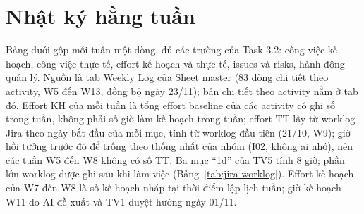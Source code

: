\chapter{Nhật ký hằng tuần}
\label{app:weekly-logs}

Bảng dưới gộp mỗi tuần một dòng, đủ các trường của Task 3.2: công việc kế hoạch, công việc thực tế, effort kế hoạch và thực tế, issues và risks, hành động quản lý. Nguồn là tab Weekly Log của Sheet master (83 dòng chi tiết theo activity, W5 đến W13, đồng bộ ngày 23/11); bản chi tiết theo activity nằm ở tab đó. Effort KH của mỗi tuần là tổng effort baseline của các activity có ghi số trong tuần, không phải số giờ làm kế hoạch trong tuần; effort TT lấy từ worklog Jira theo ngày bắt đầu của mỗi mục, tính từ worklog đầu tiên (21/10, W9); giờ hồi tưởng trước đó để trống theo thống nhất của nhóm (I02, không ai nhớ), nên các tuần W5 đến W8 không có số TT. Ba mục ``1d'' của TV5 tính 8 giờ; phần lớn worklog được ghi sau khi làm việc (Bảng~\ref{tab:jira-worklog}). Effort kế hoạch của W7 đến W8 là số kế hoạch nháp tại thời điểm lập lịch tuần; giờ kế hoạch W11 do AI đề xuất và TV1 duyệt hướng ngày 01/11.

